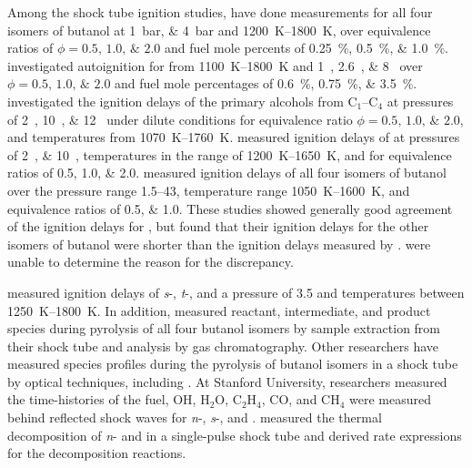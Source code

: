 \documentclass[../main.tex]{subfiles}
\begin{document}
Among the shock tube ignition studies, \textcite{Moss2008} have done
measurements for all four isomers of butanol at \SIlist{1;4}{\bar} and
\SIrange{1200}{1800}{\kelvin}, over equivalence ratios of $\phi = \numlist{0.5;1.0;2.0}$
and fuel mole percents of \SIlist{0.25;0.5;1.0}{\percent}.
\textcite{Black2010} investigated autoignition for \nBuOH{} from
\SIrange{1100}{1800}{\kelvin} and \SIlist{1;2.6;8}{\atmosphere} over $\phi = \numlist{0.5;1.0;2.0}$
and fuel mole percentages of \SIlist{0.6;0.75;3.5}{\percent}.
\textcite{Noorani2010} investigated the ignition delays of the primary alcohols
from C$_1$--C$_4$ at pressures of \SIlist{2;10;12}{\atmosphere} under dilute
conditions for equivalence ratio $\phi = \numlist{0.5;1.0;2.0}$, and temperatures
from \SIrange{1070}{1760}{\kelvin}. \textcite{Zhang2012} measured ignition
delays of \nBuOH{} at pressures of \SIlist{2;10}{\atmosphere},
temperatures in the range of \SIrange{1200}{1650}{\kelvin}, and for equivalence
ratios of \numlist{0,5;1.0;2.0}. \textcite{Stranic2012} measured ignition
delays of all four isomers of butanol over the pressure range \SIrange{1.5}{43}{\atmosphere},
temperature range \SIrange{1050}{1600}{\kelvin}, and equivalence ratios of
\numlist{0.5;1.0}. These studies showed generally good agreement of
the ignition delays for \nBuOH{}, but \textcite{Stranic2012}
found that their ignition delays for the other isomers of butanol were
shorter than the ignition delays measured by \textcite{Moss2008}.
\textcite{Stranic2012} were unable to determine the reason for the
discrepancy.

\textcite{Yasunaga2012} measured ignition delays of \textit{s}-,
\textit{t}-, and \iBuOH{} a pressure of \SI{3.5}{\atmosphere}
and temperatures between \SIrange{1250}{1800}{\kelvin}. In addition,
\textcite{Yasunaga2012} measured reactant, intermediate, and product
species during pyrolysis of all four butanol isomers by sample extraction
from their shock tube and analysis by gas chromatography. Other researchers
have measured species profiles during the pyrolysis of butanol isomers
in a shock tube by optical techniques, including \textcite{Cook2012, Stranic2012a, Stranic2013,
Rosado-Reyes2012a, Rosado-Reyes2012}. At Stanford University, researchers
measured the time-histories of the fuel, OH, H$_2$O, C$_2$H$_4$, CO, and CH$_4$
were measured behind reflected shock waves for \textit{n}-, \textit{s}-,
and \iBuOH{} \cite{Cook2012, Stranic2012a, Stranic2013}.
\textcite{Rosado-Reyes2012a, Rosado-Reyes2012} measured the thermal
decomposition of \textit{n}- and \sBuOH{} in a
single-pulse shock tube and derived rate expressions for the decomposition
reactions.
\end{document}
